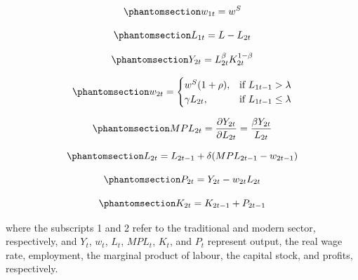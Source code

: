 \documentclass[
  letterpaper,
  DIV=11,
  numbers=noendperiod]{scrreprt}
\begin{document}
\begin{equation}\phantomsection\label{eq-lewis_w1}{
w_{1t} = w^S  
}\end{equation}

\begin{equation}\phantomsection\label{eq-lewis_L1}{
L_{1t} = L - L_{2t}  
}\end{equation}

\begin{equation}\phantomsection\label{eq-lewis_Y2}{
Y_{2t} = L_{2t}^\beta K_{2t}^{1-\beta}  
}\end{equation}

\begin{equation}\phantomsection\label{eq-lewis_w2}{
    w_{2t}= 
\begin{cases}
    w^S(1 + \rho), &    \text{if } L_{1t-1} > \lambda \\
    \gamma L_{2t},& \text{if } L_{1t-1}\leq \lambda
\end{cases}
}\end{equation}

\begin{equation}\phantomsection\label{eq-lewis_MPL}{
MPL_{2t}= \frac{\partial Y_{2t}}{\partial L_{2t}} = \frac{\beta Y_{2t}}{L_{2t}}
}\end{equation}

\begin{equation}\phantomsection\label{eq-lewis_L2}{
L_{2t}= L_{2t-1} + \delta(MPL_{2t-1} - w_{2t-1})
}\end{equation}

\begin{equation}\phantomsection\label{eq-lewis_P2}{
P_{2t}=Y_{2t} - w_{2t}L_{2t}
}\end{equation}

\begin{equation}\phantomsection\label{eq-lewis_K2}{
K_{2t}=K_{2t-1} + P_{2t-1}
}\end{equation}

where the subscripts 1 and 2 refer to the traditional and modern sector,
respectively, and \(Y_t\), \(w_t\), \(L_t\), \(MPL_t\), \(K_t\), and
\(P_t\) represent output, the real wage rate, employment, the marginal
product of labour, the capital stock, and profits, respectively.
\end{document}
